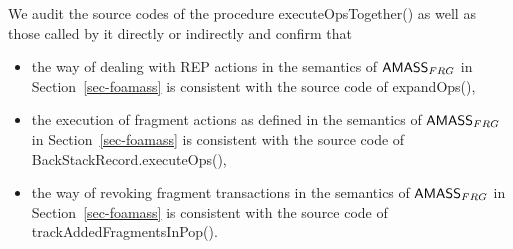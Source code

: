 We audit the source codes of the procedure executeOpsTogether() as well as those called by it directly or indirectly and confirm that 
\begin{itemize}
\item the way of dealing with REP actions in the semantics of $\textsf{AMASS}_{FRG}$ in Section~\ref{sec-foamass} is consistent with the source code of expandOps(), 
\item the execution of fragment actions as defined in the semantics of $\textsf{AMASS}_{FRG}$ in Section~\ref{sec-foamass} is consistent with the source code of BackStackRecord.executeOps(),
\item the way of revoking fragment transactions in the semantics of $\textsf{AMASS}_{FRG}$ in Section~\ref{sec-foamass} is consistent with the source code of trackAddedFragmentsInPop(). 
\end{itemize}


